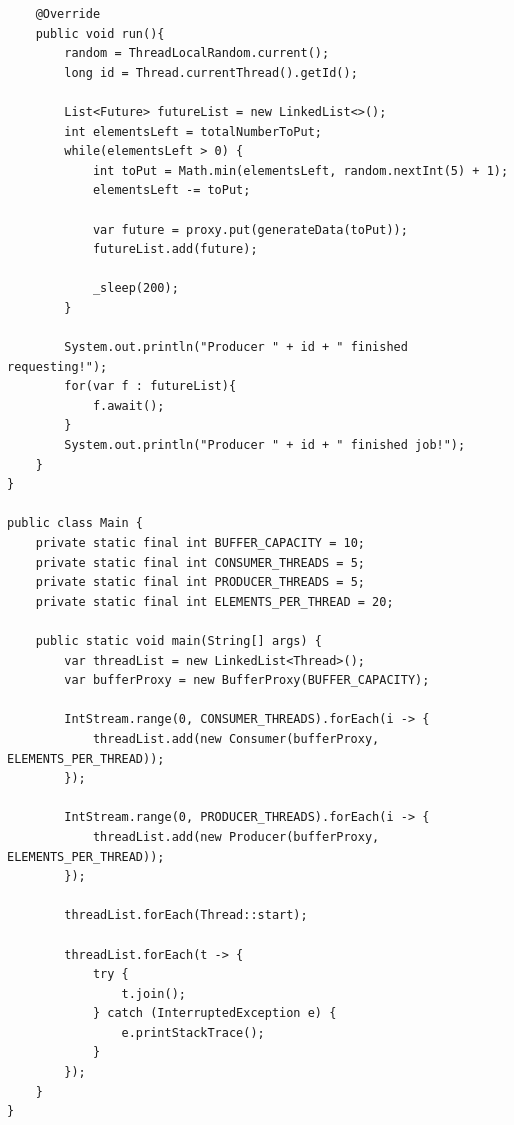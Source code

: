 \documentclass[12pt]{article}
\begin{document}
\begin{verbatim}
    @Override
    public void run(){
        random = ThreadLocalRandom.current();
        long id = Thread.currentThread().getId();

        List<Future> futureList = new LinkedList<>();
        int elementsLeft = totalNumberToPut;
        while(elementsLeft > 0) {
            int toPut = Math.min(elementsLeft, random.nextInt(5) + 1);
            elementsLeft -= toPut;

            var future = proxy.put(generateData(toPut));
            futureList.add(future);

            _sleep(200);
        }

        System.out.println("Producer " + id + " finished requesting!");
        for(var f : futureList){
            f.await();
        }
        System.out.println("Producer " + id + " finished job!");
    }
}

public class Main {
    private static final int BUFFER_CAPACITY = 10;
    private static final int CONSUMER_THREADS = 5;
    private static final int PRODUCER_THREADS = 5;
    private static final int ELEMENTS_PER_THREAD = 20;

    public static void main(String[] args) {
        var threadList = new LinkedList<Thread>();
        var bufferProxy = new BufferProxy(BUFFER_CAPACITY);

        IntStream.range(0, CONSUMER_THREADS).forEach(i -> {
            threadList.add(new Consumer(bufferProxy, ELEMENTS_PER_THREAD));
        });

        IntStream.range(0, PRODUCER_THREADS).forEach(i -> {
            threadList.add(new Producer(bufferProxy, ELEMENTS_PER_THREAD));
        });

        threadList.forEach(Thread::start);

        threadList.forEach(t -> {
            try {
                t.join();
            } catch (InterruptedException e) {
                e.printStackTrace();
            }
        });
    }
}



\end{verbatim}
\end{document}
